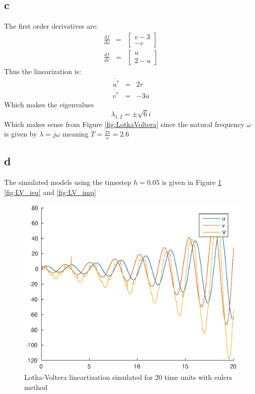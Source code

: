 \documentclass[11pt]{article}
\begin{document}
\subsection*{c}
The first order derivatives are:
\begin{eqnarray*}
\frac{df}{du} &=& \begin{bmatrix} v-3 \\ -v \end{bmatrix} \\
\frac{df}{dv} &=& \begin{bmatrix} u \\ 2-u \end{bmatrix} 
\end{eqnarray*}
Thus the linearization is:
\begin{eqnarray*}
\dot{u^*} &=&  2v \\
\dot{v^*} &=& -3u
\end{eqnarray*}
Which makes the eigenvalues
\[\lambda_{1,2} = \pm \sqrt{6} i \]
Which makes sense from Figure \ref{fig:LotkaVoltera} since the natural frequency $\omega$ is given by $\lambda = j\omega$ meaning $T = \frac{2 \pi}{\omega} = 2.6$

\subsection*{d}
The simulated models using the timestep $h = 0.05$ is given in Figure \ref{fig:LV_eeu} \ref{fig:LV_ieu} and \ref{fig:LV_imp}

\begin{figure}[h]
\centering
\includegraphics[width=.8\textwidth]{LV_eeu.eps}
\caption{Lotka-Voltera lineartization simulated for 20 time units with eulers method}
\label{fig:LV_eeu}
\end{figure}
\end{document}
